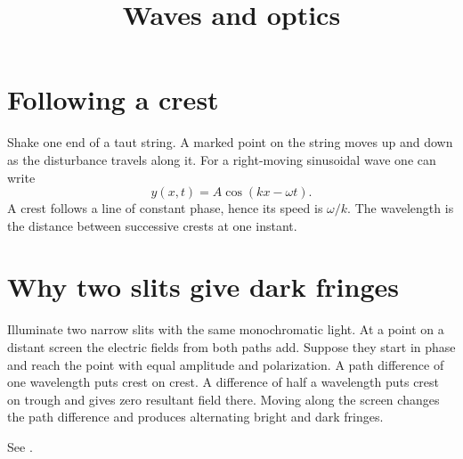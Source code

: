 



\title{
Waves and optics}
\maketitle

\tableofcontents

\section{Following a crest}
Shake one end of a taut string. A marked
point on the string moves up and down as the
disturbance travels along it. For a
right-moving sinusoidal wave one can write
$$
y(x,t)=A\cos(kx-\omega t).
$$
A crest follows a line of constant phase,
hence its speed is $\omega/k$. The wavelength
is the distance between successive crests at
one instant.

\section{Why two slits give dark fringes}
Illuminate two narrow slits with the same
monochromatic light. At a point on a distant
screen the electric fields from both paths
add. Suppose they start in phase and reach
the point with equal amplitude and
polarization. A path difference of one
wavelength puts crest on crest. A difference
of half a wavelength puts crest on trough and
gives zero resultant field there. Moving
along the screen changes the path difference
and produces alternating bright and dark
fringes.

See \cite[Vol. I, Sections 29-3 to 29-5 and
47-2 to 47-4]{feynman-lectures}.





